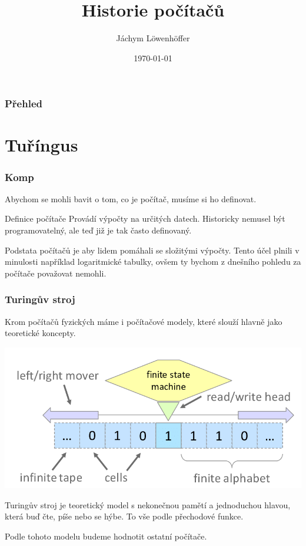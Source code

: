 \documentclass{beamer}
\title[amogus]{Historie počítačů} %
\author{Jáchym Löwenhöffer} %
\institute[GEVO] %
{
Gynekologická Evaluace Velkých Obrazů \\ %
\medskip
\textit{jachym.lowenhoffer@gmail.com} %
}
\date{\today} %
\begin{document}
\begin{frame}
	\titlepage %
\end{frame}

\begin{frame}
	\frametitle{Přehled} %
	\tableofcontents %
\end{frame}

\section{Tuříngus}
\label{sec:turingus}


\begin{frame}
	\frametitle{Komp}
Abychom se mohli bavit o tom, co je počítač, musíme si ho definovat.
  \begin{block}{Definice počítače}
	 Provádí výpočty na určitých datech. Historicky nemusel být programovatelný,
	 ale teď již je tak často definovaný.
	\end{block}
	Podstata počítačů je aby lidem pomáhali se složitými výpočty. Tento účel
	plnili v minulosti například logaritmické tabulky, ovšem ty bychom z dnešního
	pohledu za počítače považovat nemohli.
\end{frame}

\begin{frame}
 \frametitle{Turingův stroj}
 Krom počítačů fyzických máme i počítačové modely, které slouží hlavně jako
 teoretické koncepty.

 \centering
 \includegraphics[scale=0.3]{turing.png}

\raggedright

 Turingův stroj je teoretický model s nekonečnou pamětí a jednoduchou hlavou,
 která buď čte, píše nebo se hýbe. To vše podle přechodové funkce.

 Podle tohoto modelu budeme hodnotit ostatní počítače.
\end{frame}
\end{document}
